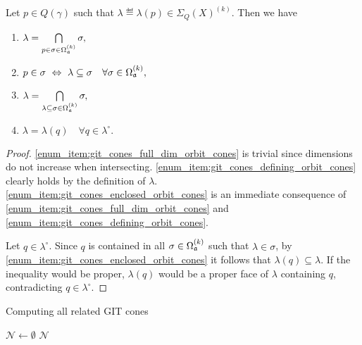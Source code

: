 \begin{lemma}
	\label{lemma:git_cones_elementary_properties}
	Let $p\in Q(\gamma)$ such that $\lambda \eqdef \lambda(p)\in\Sigma_Q(X)^{(k)}$. Then we have
	\begin{enumerate}[label={\upshape(\roman*)}]
		\item $\lambda = \bigcap\limits_{p\in\sigma\in\Omega_{\mathfrak{a}}^{(k)}}\sigma,$
			\label{enum_item:git_cones_full_dim_orbit_cones}
		\item $p\in\sigma\ \Leftrightarrow\ \lambda\subseteq\sigma\quad\forall\sigma\in\Omega_\ideal^{(k)},$
			\label{enum_item:git_cones_defining_orbit_cones}
		\item $\lambda = \bigcap\limits_{\lambda\subseteq\sigma\in\Omega_{\mathfrak{a}}^{(k)}}\sigma,$
			\label{enum_item:git_cones_enclosed_orbit_cones}
		\item $\lambda = \lambda(q)\quad \forall q\in\lambda^\circ.$
			\label{enum_item:git_cones_relative_interior}
	\end{enumerate}
\end{lemma}
\begin{proof}
	\ref{enum_item:git_cones_full_dim_orbit_cones} is trivial since dimensions do not increase when intersecting. \ref{enum_item:git_cones_defining_orbit_cones} clearly holds by the definition of $\lambda$. \ref{enum_item:git_cones_enclosed_orbit_cones} is an immediate consequence of \ref{enum_item:git_cones_full_dim_orbit_cones} and \ref{enum_item:git_cones_defining_orbit_cones}.
	
	Let $q\in\lambda^\circ$. Since $q$ is contained in all $\sigma\in\Omega_{\mathfrak{a}}^{(k)}$ such that $\lambda\in\sigma$, by \ref{enum_item:git_cones_enclosed_orbit_cones} it follows that $\lambda(q)\subseteq\lambda$. If the inequality would be proper, $\lambda(q)$ would be a proper face of $\lambda$ containing $q$, contradicting $q\in\lambda^\circ$.
\end{proof}

\begin{algorithm}
	\caption{Computing all related GIT cones}
	\label{algo:compute_git_cone_neighbours}
	
	\BlankLine
	$\mathcal{N} \leftarrow \emptyset$\;
	\Return $\mathcal{N}$\;
\end{algorithm}

